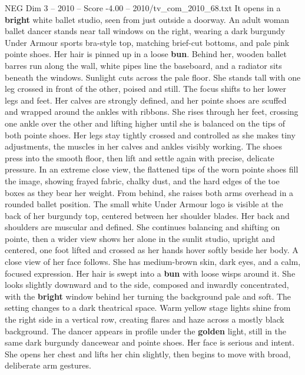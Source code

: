 \begin{textsample}{NEG Dim 3 – 2010 – Score -4.00 – 2010/tv\_com\_2010\_68.txt}  \label{ex:f3_neg_003}
It opens in a \textbf{bright} white ballet studio, seen from just outside a doorway.
An adult woman ballet dancer stands near tall windows on the right, wearing a dark burgundy Under Armour sports bra-style top, matching brief-cut bottoms, and pale pink pointe shoes.
Her hair is pinned up in a loose \textbf{bun}.
Behind her, wooden ballet barres run along the wall, white pipes line the baseboard, and a radiator sits beneath the windows.
Sunlight cuts across the pale floor.
She stands tall with one leg crossed in front of the other, poised and still.
The focus shifts to her lower legs and feet.
Her calves are strongly defined, and her pointe shoes are scuffed and wrapped around the ankles with ribbons.
She rises through her feet, crossing one ankle over the other and lifting higher until she is balanced on the tips of both pointe shoes.
Her legs stay tightly crossed and controlled as she makes tiny adjustments, the muscles in her calves and ankles visibly working.
The shoes press into the smooth floor, then lift and settle again with precise, delicate pressure.
In an extreme close view, the flattened tips of the worn pointe shoes fill the image, showing frayed fabric, chalky dust, and the hard edges of the toe boxes as they bear her weight.
From behind, she raises both arms overhead in a rounded ballet position.
The small white Under Armour logo is visible at the back of her burgundy top, centered between her shoulder blades.
Her back and shoulders are muscular and defined.
She continues balancing and shifting on pointe, then a wider view shows her alone in the sunlit studio, upright and centered, one foot lifted and crossed as her hands hover softly beside her body.
A close view of her face follows.
She has medium-brown skin, dark eyes, and a calm, focused expression.
Her hair is swept into a \textbf{bun} with loose wisps around it.
She looks slightly downward and to the side, composed and inwardly concentrated, with the \textbf{bright} window behind her turning the background pale and soft.
The setting changes to a dark theatrical space.
Warm yellow stage lights shine from the right side in a vertical row, creating flares and haze across a mostly black background.
The dancer appears in profile under the \textbf{golden} light, still in the same dark burgundy dancewear and pointe shoes.
Her face is serious and intent.
She opens her chest and lifts her chin slightly, then begins to move with broad, deliberate arm gestures.

\end{textsample}

